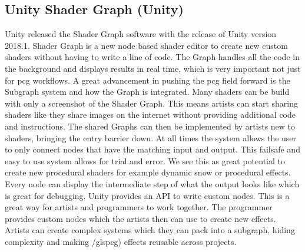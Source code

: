 \documentclass[10pt,a4paper]{article}
\begin{document}
\subsection{Unity Shader Graph (Unity)}
\begin{multicols}{2}
Unity released the Shader Graph software with the release of Unity version 2018.1. Shader Graph is a new node based shader editor to create new custom shaders without having to write a line of code. The Graph handles all the code in the background and displays results in real time, which is very important not just for \gls{pcg} workflows. A great advancement in pushing the \gls{pcg} field forward is the Subgraph system and how the Graph is integrated. Many shaders can be build with only a screenshot of the Shader Graph. This means artists can start sharing shaders like they share images on the internet without providing additional code and instructions. The shared Graphs can then be implemented by artists new to shaders, bringing the entry barrier down. At all times the system allows the user to only connect nodes that have the matching input and output. This failsafe and easy to use system allows for trial and error. We see this as great potential to create new procedural shaders for example dynamic snow or procedural effects. Every node can display the intermediate step of what the output looks like which is great for debugging. Unity provides an API to write custom nodes. This is a great way for artists and programmers to work together. The programmer provides custom nodes which the artists then can use to create new effects. Artists can create complex systems which they can pack into a subgraph, hiding complexity and making /gls{pcg}) effects reusable across projects.
\end{multicols}
\end{document}
